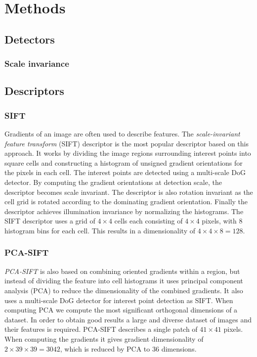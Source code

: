 \documentclass[../thesis.tex]{subfiles}
\begin{document}
\section{Methods}

\subsection{Detectors}

\subsubsection{Scale invariance}

\subsection{Descriptors}

\subsubsection{SIFT}

Gradients of an image are often used to describe features.
The \emph{scale-invariant feature transform} (SIFT) descriptor
\cite{lowe2004distinctive} is the most popular descriptor based on this
approach. It works by dividing the image regions surrounding interest
points into square cells and constructing a histogram of unsigned gradient
orientations for the pixels in each cell. The interest points are detected
using a multi-scale DoG detector. By computing the gradient orientations
at detection scale, the descriptor becomes scale invariant. The descriptor
is also rotation invariant as the cell grid is rotated according to the
dominating gradient orientation. Finally the descriptor achieves illumination
invariance by normalizing the histograms. The SIFT descriptor uses a grid of
$4 \times 4$ cells each consisting of $4 \times 4$ pixels, with 8 histogram
bins for each cell. This results in a dimensionality of $4 \times 4 \times 8 =
128$.

\subsubsection{PCA-SIFT}

\emph{PCA-SIFT} \cite{ke2004pca} is also based on combining oriented gradients
within a region, but instead of dividing the feature into cell histograms
it uses principal component analysis (PCA) to reduce the dimensionality
of the combined gradients. It also uses a multi-scale DoG detector for
interest point detection as SIFT. When computing PCA we compute the most
significant orthogonal dimensions of a dataset. In order to obtain good
results a large and diverse dataset of images and their features is required.
PCA-SIFT describes a single patch of $41 \times 41$ pixels. When computing
the gradients it gives gradient dimensionality of $2\times39\times39 = 3042$,
which is reduced by PCA to 36 dimensions.
\end{document}
